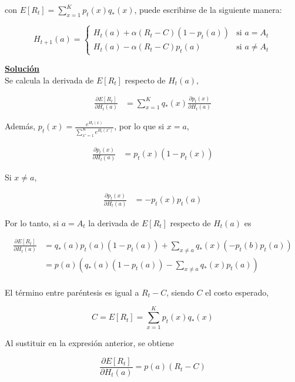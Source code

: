 \documentclass[12pt]{article}
\newlength\tindent
\renewcommand{\indent}{\hspace*{\tindent}}
\begin{document}
\begin{itemize}
    con $E[R_t] = \sum_{x=1}^{K} p_t(x)q_{*}(x)$, puede escribirse de la siguiente manera:

    \[
        H_{t+1}(a) =
        \begin{cases}
            H_t (a) + \alpha (R_t - C)(1-p_t(a))    &\text{si $a = A_t$} \\
            H_t (a) - \alpha (R_t - C)p_t(a)        &\text{si $a \neq A_t$}
        \end{cases}
    \]

    \indent\underline{\textbf{Solución}}\\
    Se calcula la derivada de $E[R_t]$ respecto de $H_t(a)$,

    \begin{align*}
        \frac{\partial E[R_t]}{\partial H_t(a)} &= \sum_{x=1}^{K} q_{*}(x) \frac{\partial p_t(x)}{\partial H_t(a)}
    \end{align*}

    Además, $p_t(x) = \frac{e^{H_t(x)}}{\sum_{x'=1}^{K} e^{H_t(x')}}$, por lo que si $x=a$,

    \begin{align*}
        \frac{\partial p_t(x)}{\partial H_t(a)} &= p_t(x)(1-p_t(x))
    \end{align*}

    Si $x\neq a$,

    \begin{align*}
        \frac{\partial p_t(x)}{\partial H_t(a)} &= -p_t(x)p_t(a)
    \end{align*}

    Por lo tanto, si $a=A_t$ la derivada de $E[R_t]$ respecto de $H_t(a)$ es

    \begin{align*}
        \frac{\partial E[R_t]}{\partial H_t(a)} &= q_{*}(a)p_t(a)(1-p_t(a)) + \sum_{x\neq a} q_{*}(x)(-p_t(b)p_t(a)) \\
        &= p(a)\left( q_{*}(a)(1-p_t(a)) - \sum_{x\neq a} q_{*}(x)p_t(a) \right) \\
    \end{align*}

    El término entre paréntesis es igual a $R_t - C$, siendo $C$ el costo esperado,

    \[
        C = E[R_t] = \sum_{x=1}^{K} p_t(x)q_{*}(x)
    \]

    Al sustituir en la expresión anterior, se obtiene

    \[
        \frac{\partial E[R_t]}{\partial H_t(a)} = p(a)(R_t - C)
    \]


\end{itemize}
\end{document}
